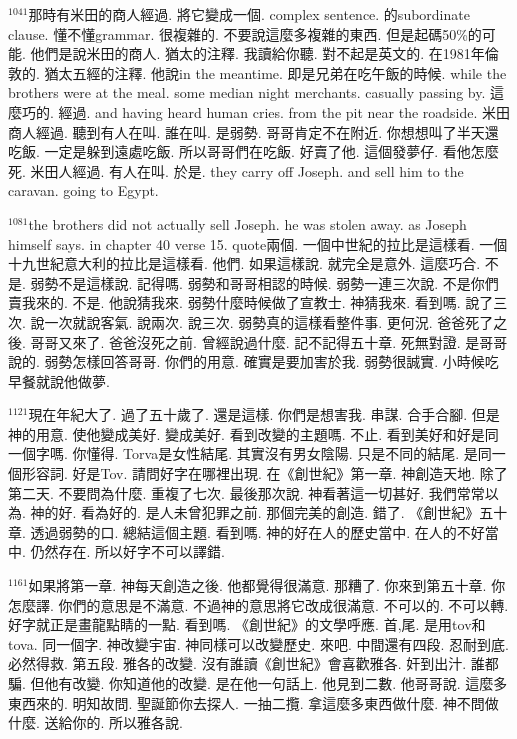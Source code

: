 \documentclass{book}
\begin{document}
$^{1041}$那時有米田的商人經過.
將它變成一個.
complex sentence.
的subordinate clause.
懂不懂grammar.
很複雜的.
不要說這麼多複雜的東西.
但是起碼50\%的可能.
他們是說米田的商人.
猶太的注釋.
我讀給你聽.
對不起是英文的.
在1981年倫敦的.
猶太五經的注釋.
他說in the meantime.
即是兄弟在吃午飯的時候.
while the brothers were at the meal.
some median night merchants.
casually passing by.
這麼巧的.
經過.
and having heard human cries.
from the pit near the roadside.
米田商人經過.
聽到有人在叫.
誰在叫.
是弱勢.
哥哥肯定不在附近.
你想想叫了半天還吃飯.
一定是躲到遠處吃飯.
所以哥哥們在吃飯.
好賣了他.
這個發夢仔.
看他怎麼死.
米田人經過.
有人在叫.
於是.
they carry off Joseph.
and sell him to the caravan.
going to Egypt.

$^{1081}$the brothers did not actually sell Joseph.
he was stolen away.
as Joseph himself says.
in chapter 40 verse 15.
quote兩個.
一個中世紀的拉比是這樣看.
一個十九世紀意大利的拉比是這樣看.
他們.
如果這樣說.
就完全是意外.
這麼巧合.
不是.
弱勢不是這樣說.
記得嗎.
弱勢和哥哥相認的時候.
弱勢一連三次說.
不是你們賣我來的.
不是.
他說猜我來.
弱勢什麼時候做了宣教士.
神猜我來.
看到嗎.
說了三次.
說一次就說客氣.
說兩次.
說三次.
弱勢真的這樣看整件事.
更何況.
爸爸死了之後.
哥哥又來了.
爸爸沒死之前.
曾經說過什麼.
記不記得五十章.
死無對證.
是哥哥說的.
弱勢怎樣回答哥哥.
你們的用意.
確實是要加害於我.
弱勢很誠實.
小時候吃早餐就說他做夢.

$^{1121}$現在年紀大了.
過了五十歲了.
還是這樣.
你們是想害我.
串謀.
合手合腳.
但是神的用意.
使他變成美好.
變成美好.
看到改變的主題嗎.
不止.
看到美好和好是同一個字嗎.
你懂得.
Torva是女性結尾.
其實沒有男女陰陽.
只是不同的結尾.
是同一個形容詞.
好是Tov.
請問好字在哪裡出現.
在《創世紀》第一章.
神創造天地.
除了第二天.
不要問為什麼.
重複了七次.
最後那次說.
神看著這一切甚好.
我們常常以為.
神的好.
看為好的.
是人未曾犯罪之前.
那個完美的創造.
錯了.
《創世紀》五十章.
透過弱勢的口.
總結這個主題.
看到嗎.
神的好在人的歷史當中.
在人的不好當中.
仍然存在.
所以好字不可以譯錯.

$^{1161}$如果將第一章.
神每天創造之後.
他都覺得很滿意.
那糟了.
你來到第五十章.
你怎麼譯.
你們的意思是不滿意.
不過神的意思將它改成很滿意.
不可以的.
不可以轉.
好字就正是畫龍點睛的一點.
看到嗎.
《創世紀》的文學呼應.
首,尾.
是用tov和tova.
同一個字.
神改變宇宙.
神同樣可以改變歷史.
來吧.
中間還有四段.
忍耐到底.
必然得救.
第五段.
雅各的改變.
沒有誰讀《創世紀》會喜歡雅各.
奸到出汁.
誰都騙.
但他有改變.
你知道他的改變.
是在他一句話上.
他見到二數.
他哥哥說.
這麼多東西來的.
明知故問.
聖誕節你去探人.
一抽二攬.
拿這麼多東西做什麼.
神不問做什麼.
送給你的.
所以雅各說.
\end{document}
